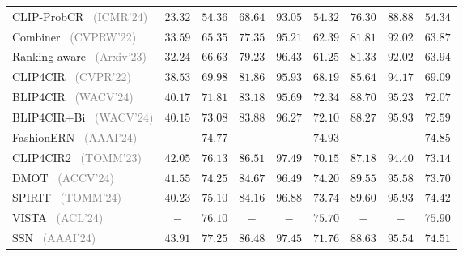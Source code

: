 \begin{table*}
\begin{tabular}{l|cccc|ccc|c}
    CLIP-ProbCR~\cite{li2024clip} \footnotesize{\textcolor{gray}{(ICMR'24)}} & $23.32$ & $54.36$ & $68.64$ & $93.05$ & $54.32$ & $76.30$ & $88.88$ & $54.34$\\
    Combiner~\cite{baldrati2022Combiner} \footnotesize{\textcolor{gray}{(CVPRW'22)}} & $33.59$ & $65.35$ & $77.35$ & $95.21$ & $62.39$ & $81.81$ & $92.02$ & $63.87$ \\
    Ranking-aware~\cite{chen2023ranking} \footnotesize{\textcolor{gray}{(Arxiv'23)}} & $32.24$ & $66.63$ & $79.23$ & $96.43$ & $61.25$ & $81.33$ & $92.02$ & $63.94$ \\
    CLIP4CIR~\cite{baldrati2022CLIP4CIR} \footnotesize{\textcolor{gray}{(CVPR'22)}} & $38.53$ & $69.98$ & $81.86$ & $95.93$ & $68.19$ & $85.64$ & $94.17$ & $69.09$ \\
    BLIP4CIR~\cite{liu2024blip4cir} \footnotesize{\textcolor{gray}{(WACV'24)}} & $40.17$ & $71.81$ & $83.18$ & $95.69$ & $72.34$ & $88.70$ & $95.23$ & $72.07$ \\
    BLIP4CIR+Bi~\cite{liu2024blip4cir} \footnotesize{\textcolor{gray}{(WACV'24)}} & $40.15$ & $73.08$ & $83.88$ & $96.27$ & $72.10$ & $88.27$ & $95.93$ & $72.59$ \\
    FashionERN~\cite{chen2024fashionern} \footnotesize{\textcolor{gray}{(AAAI'24)}} & $-$ & $74.77$ & $-$ & $-$ & $74.93$ & $-$ & $-$ & $74.85$ \\
    CLIP4CIR2~\cite{baldrati2023CLIP4CIR2} \footnotesize{\textcolor{gray}{(TOMM'23)}} & $42.05$ & $76.13$ & $86.51$ & $97.49$ & $70.15$ & $87.18$ & $94.40$ & $73.14$ \\
    DMOT~\cite{dmot} \footnotesize{\textcolor{gray}{(ACCV'24)}} & $41.55$ & $74.25$ & $84.67$ & $96.49$ & $74.20$ & $89.55$ & $95.58$ & $73.70$ \\
    SPIRIT~\cite{chen2024spirit} \footnotesize{\textcolor{gray}{(TOMM'24)}} & $40.23$ & $75.10$ & $84.16$ & $96.88$ & $73.74$ & $89.60$ & $95.93$ & $74.42$ \\
    VISTA~\cite{zhou2024vista} \footnotesize{\textcolor{gray}{(ACL'24)}} & $-$ & $76.10$ & $-$ & $-$ & $75.70$ & $-$ & $-$ & $75.90$ \\
    SSN~\cite{yang2024ssn} \footnotesize{\textcolor{gray}{(AAAI'24)}} & $43.91$ & $77.25$ & $86.48$ & $97.45$ & $71.76$ & $88.63$ & $95.54$ & $74.51$ \\

\end{tabular}
\end{table*}
